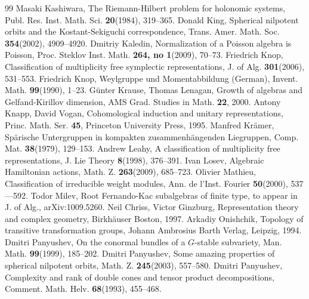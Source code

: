 \documentclass[12pt]{amsart}
\theoremstyle{definition}\newtheorem{theorem}{Theorem}[section]
\theoremstyle{definition}\newtheorem{definition}[proposition]{Definition}
\theoremstyle{remark}\newtheorem{example}[proposition]{Example}
\begin{document}
\begin{thebibliography}{99}
 Masaki Kashiwara, The Riemann-Hilbert problem for holonomic systems,  Publ. Res. Inst. Math. Sci. {\bf20}(1984), 319--365.
 Donald King, Spherical nilpotent orbits and the Kostant-Sekiguchi correspondence, Trans. Amer. Math. Soc.  {\bf354}(2002), 4909--4920.
 Dmitriy Kaledin, Normalization of a Poisson algebra is Poisson, Proc. Steklov Inst. Math.  {\bf264, no 1}(2009), 70--73.
 Friedrich Knop, Classification of multiplicity free symplectic representations, J. of Alg. {\bf301}(2006), 531--553.
 Friedrich Knop, Weylgruppe und Momentabbildung (German), Invent. Math.  {\bf99}(1990), 1--23.
 G\"unter Krause, Thomas Lenagan, Growth of algebras and Gelfand-Kirillov dimension, AMS Grad. Studies in Math. {\bf22}, 2000.
 Antony Knapp, David Vogan, Cohomological induction and unitary representations, Princ. Math. Ser. {\bf45}, Princeton University Press, 1995.
 Manfred Kr\"amer, Sp\"arische Untergruppen in kompakten zusammenh\"angenden Liegruppen, Comp. Mat. {\bf38}(1979), 129--153.
 Andrew Leahy, A classification of multiplicity free representations, J. Lie Theory {\bf8}(1998), 376--391.
 Ivan Losev, Algebraic Hamiltonian actions, Math. Z. {\bf263}(2009), 685--723.
 Olivier Mathieu, Classification of irreducible weight modules, Ann. de l'Inst. Fourier {\bf50}(2000), 537---592.
Todor Milev, Root Fernando-Kac subalgebras of finite type, to appear in J. of Alg., arXiv:1009.5260.
 Neil Chriss, Victor Ginzburg, Representation theory and complex geometry, Birkh\"auser Boston, 1997.
  Arkadiy Onishchik, Topology of transitive transformation groups, Johann Ambrosius Barth Verlag, Leipzig, 1994.
 Dmitri Panyushev, On the conormal bundles of a $G$-stable subvariety, Man. Math. {\bf99}(1999), 185--202.
 Dmitri Panyushev, Some amazing properties of spherical nilpotent orbits,  Math. Z. {\bf245}(2003), 557--580.
 Dmitri Panyushev, Complexity and rank of double cones and tensor product decompositions,  Comment. Math. Helv.  {\bf68}(1993), 455--468.

\end{thebibliography}
\end{document}
